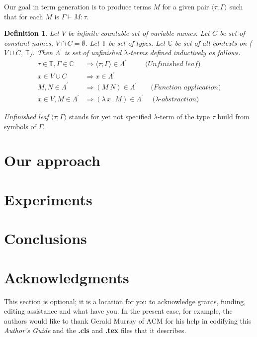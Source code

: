 \documentclass{sig-alternate}
\newtheorem{definition}{Definition}
\newcommand{\lterm}{$\lambda$-term\xspace}
\newcommand{\lterms}{$\lambda$-terms\xspace}
\newcommand{\tur}[3]{#1\vdash{}#2 \colon #3}
\newcommand{\then}{\Rightarrow\xspace}
\newcommand{\lamb}[2]{( \lambda \, #1 \, . \, #2 )}
\newcommand{\T}{\mathbb{T}\xspace}
\newcommand{\C}{\mathbb{C}\xspace}
\newcommand{\Lpr}{\Lambda^\prime}
\newcommand{\ul}[2]{\langle #1 ; #2 \rangle}
\begin{document}
Our goal in term generation is to produce terms $M$
for a given pair $\ul{\tau}{\Gamma}$
such that for each $M$ is $\tur{\Gamma}{M}{\tau}$.

\begin{definition}
Let $V$ be infinite countable set of {\it 
variable names}. Let $C$ be set of {\it constant names}, 
$V \cap C = \emptyset$.	
Let $\T$ be set of types.
Let $\C$ be set of all contexts on ($V \cup C$, $\T$).
Then $\Lpr$ is set of 
\textit{unfinished  \lterms} defined inductively as follows.	
\begin{align*}
\tau \in \T , \Gamma \in \C &\then \ul{\tau}{\Gamma} \in \Lpr
\textit{~~~~~~~~(Unfinished leaf)}\\
x   \in V \cup C  &\then x     \in \Lpr \\
M,N \in \Lpr   &\then (M~N) \in \Lpr 
\textit{~~~~~~(Function application)} \\
x   \in V , M \in \Lpr &\then \lamb{x}{M} \in \Lpr
\textit{~~~~($\lambda$-abstraction)} 
\end{align*}
\end{definition}

\textit{Unfinished leaf} $\ul{\tau}{\Gamma}$ 
stands for yet not specified \lterm of the type $\tau$ 
build from symbols of $\Gamma$.


\section{Our approach}
\label{approach}

\section{Experiments}
\label{experiments}

\section{Conclusions}
\label{conclusions}


\section{Acknowledgments}
This section is optional; it is a location for you
to acknowledge grants, funding, editing assistance and
what have you.  In the present case, for example, the
authors would like to thank Gerald Murray of ACM for
his help in codifying this \textit{Author's Guide}
and the \textbf{.cls} and \textbf{.tex} files that it describes.

%

%
%


\end{document}
